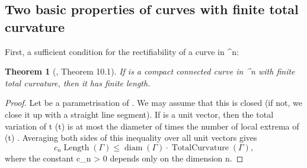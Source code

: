 \documentclass[a4paper, 11pt]{article}
\theoremstyle{plain}
\newtheorem{theorem}{Theorem}[section]
\theoremstyle{definition}
\theoremstyle{remark}
\numberwithin{equation}{subsection}
\def\({}
\def\){}
\def\pi{}
\begin{document}



\subsection{Two basic properties of curves with finite total curvature}

First, a sufficient condition for the rectifiability of a curve in \(^{n}\):

\begin{theorem}[{\cite{EWW02}, Theorem 10.1}]
\label{Basic_Property_1}
If \(\Gamma\) is a compact connected curve in \(^{n}\) with finite total curvature, then it has finite length.
\end{theorem}

\begin{proof}
Let \(\gamma\) be a parametrisation of \(\Gamma\). We may assume that this is closed (if not, we close it up with a straight line segment). If \(\) is a unit vector, then the total variation of \(t \mapsto \gamma(t) \cdot {}\) is at most the diameter of \(\Gamma\) times the number of local extrema of \(\gamma(t) \cdot {}\). Averaging both sides of this inequality over all unit vectors \(\) gives
\begin{equation}
c_{n}\operatorname{Length}(\Gamma) \leqslant \operatorname{diam}(\Gamma) \cdot \operatorname{TotalCurvature}(\Gamma),
\end{equation}
where the constant \(c_{n} > 0\) depends only on the dimension \(n\).
\end{proof}
\end{document}

